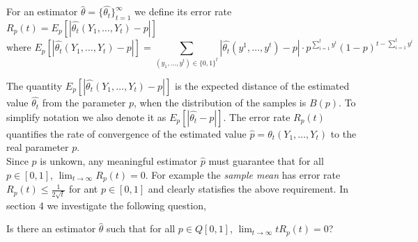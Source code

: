 \begin{definition}
  For an estimator $\hat{\theta}
  =\{\hat{\theta_t}\}_{t=1}^\infty$ we define its  error rate $R_p(t) =
  E_p[|\hat{\theta_t}(Y_1,\ldots,Y_t) - p|]$ \[\text{where
    }E_p[|\hat{\theta_t}(Y_1,\ldots,Y_t) - p|]= \sum_{(y_1,\ldots,y^t)\in
      \{0,1\}^t}|\hat{\theta_t}(y^1,\ldots,y^t) -p| \cdot
    p^{\sum_{i=1}^ty^i}(1-p)^{t-\sum_{i=1}^ty^i}\]
\end{definition}

The quantity $E_p[|\hat{\theta_t}(Y_1,\ldots,Y_t) - p|]$ is the expected distance
of the estimated value $\hat{\theta_t}$ from the parameter $p$, when the
distribution of the samples is $B(p)$. To simplify notation we also denote it
as $E_p[|\hat{\theta_t} - p|]$. The error rate $R_p(t)$ quantifies the rate of
convergence of the estimated value $\hat{p} =\theta_t(Y_1,\ldots,Y_t)$ to the
real parameter $p$. \\ Since $p$ is unkown, any meaningful estimator $\hat{p}$
must guarantee that for all $p \in [0,1]$, $\lim_{t \rightarrow \infty}
R_p(t)=0$. For example the \emph{sample mean} has error rate $R_p(t) \leq
\frac{1}{2\sqrt{t}}$ for ant $p \in [0,1]$ and clearly statisfies the above
requirement. In section 4 we investigate the following question,

\begin{question}
  Is there an estimator $\hat{\theta}$ such that for all $p \in
  Q[0,1]$, $\lim_{t \rightarrow \infty}t R_p(t)=0$?
\end{question}



